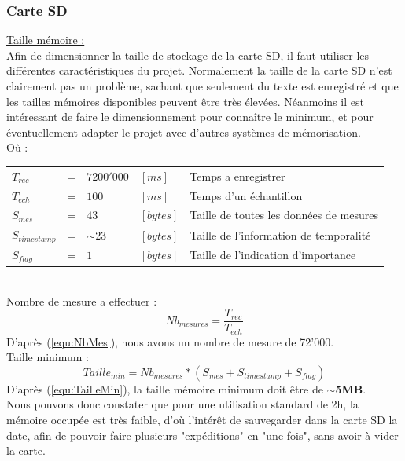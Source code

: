 {\subsubsection{Carte SD} \label{sssec:CarteSD}
{
    \underline{Taille mémoire :} \\
    Afin de dimensionner la taille de stockage de la carte SD, il faut utiliser les différentes caractéristiques du projet. Normalement la taille de la carte SD n'est clairement pas un problème, sachant que seulement du texte est enregistré et que les tailles mémoires disponibles peuvent être très élevées. Néanmoins il est intéressant de faire le dimensionnement pour connaître le minimum, et pour éventuellement adapter le projet avec d'autres systèmes de mémorisation.  \\
    Où : \vspace{+14pt} \\
    \begin{tabular}{l l ll|l}
       $ T_{rec} $ & = &  $7200'000$ & $[ms]$ & Temps a enregistrer \\
       $ T_{ech}$ & = & $100$  & $[ms]$ & Temps d'un échantillon \\
       $ S_{mes} $ & = & $43$ & $[bytes]$ & Taille de toutes les données de mesures  \\
       $ S_{timestamp} $ & = & $\sim$23 & $[bytes]$ & Taille de l'information de temporalité  \\
       $ S_{flag} $ & = & $ 1 $ & $[bytes]$ & Taille de l'indication d'importance 
    \end{tabular}
    \vspace{+14pt}
    \\
    Nombre de mesure a effectuer : \\ 
    \begin{equation} \label{equ:NbMes}
        Nb_{mesures} = \frac{T_{rec}}{T_{ech}}
    \end{equation} 
    D'après (\ref{equ:NbMes}), nous avons un nombre de mesure de 72'000.  \vspace{+8pt} \\
    
    Taille minimum : \\
    \begin{equation} \label{equ:TailleMin}
        Taille_{min} = Nb_{mesures} * (S_{mes}+S_{timestamp}+S_{flag}) 
    \end{equation}
    D'après (\ref{equ:TailleMin}), la taille mémoire minimum doit être de \textbf{$\sim$5MB}. \vspace{+8pt} \\ 
    Nous pouvons donc constater que pour une utilisation standard de 2h, la mémoire occupée est très faible, d'où l'intérêt de sauvegarder dans la carte SD la date, afin de pouvoir faire plusieurs "expéditions" en "une fois", sans avoir à vider la carte.
}

}
